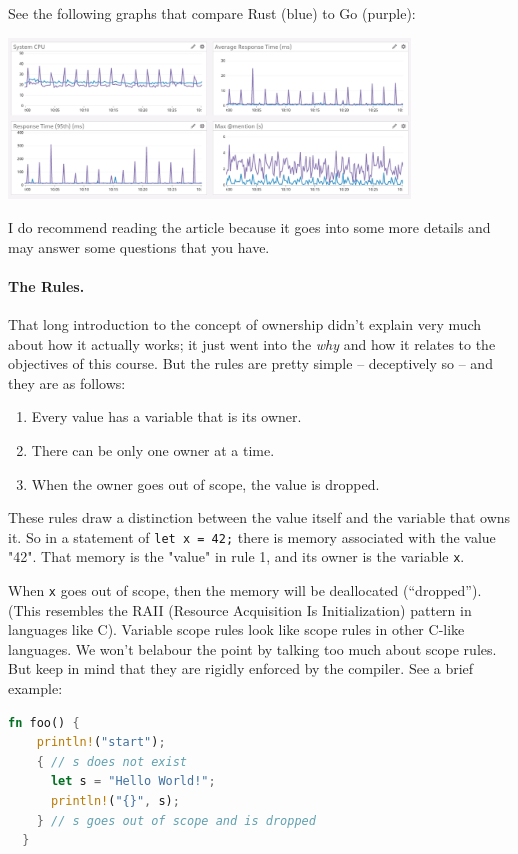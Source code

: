 \documentclass[a4paper]{report}
\newcommand{\CPP}{C\nolinebreak\hspace{-.05em}\raisebox{.4ex}{\tiny\bf +}\nolinebreak\hspace{-.10em}\raisebox{.4ex}{\tiny\bf +}}
\def\CPP{{C\nolinebreak[4]\hspace{-.05em}\raisebox{.4ex}{\tiny\bf ++}}}
\begin{document}
See the following graphs that compare Rust (blue) to Go (purple): 
\begin{center}
\includegraphics[width=0.8\textwidth]{images/rust-vs-go.png}
\end{center}

I do recommend reading the article because it goes into some more details and may answer some questions that you have. 

\paragraph{The Rules.}
That long introduction to the concept of ownership didn't explain very much about how it actually works; it just went into the \textit{why} and how it relates to the objectives of this course. But the rules are pretty simple -- deceptively so -- and they are as follows:

\begin{enumerate}
	\item Every value has a variable that is its owner.
	\item There can be only one owner at a time.
	\item When the owner goes out of scope, the value is dropped.
\end{enumerate}

These rules draw a distinction between the value itself and the variable that owns it. So in a statement of \texttt{let x = 42;} there is memory associated with the value "42". That memory is the "value" in rule 1, and its owner is the variable \texttt{x}.

When \texttt{x} goes out of scope, then the memory will be deallocated (``dropped''). (This resembles the RAII (Resource Acquisition Is Initialization) pattern in languages like \CPP). Variable scope rules look like scope rules in other C-like languages. We won't belabour the point by talking too much about scope rules. But keep in mind that they are rigidly enforced by the compiler. See a brief example:
\begin{lstlisting}[language=Rust]
  fn foo() {
    println!("start");
    { // s does not exist
      let s = "Hello World!";
      println!("{}", s);
    } // s goes out of scope and is dropped
  }
\end{lstlisting}
\end{document}
